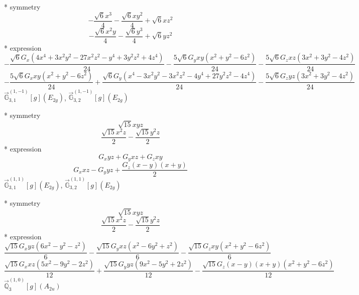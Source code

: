 \documentclass[fleqn,8pt]{jsarticle}
\begin{document}
\noindent\quad ** symmetry
\begin{dmath*}
- \frac{\sqrt{6} x^{3}}{4} - \frac{\sqrt{6} x y^{2}}{4} + \sqrt{6} x z^{2}
\end{dmath*}
\begin{dmath*}
- \frac{\sqrt{6} x^{2} y}{4} - \frac{\sqrt{6} y^{3}}{4} + \sqrt{6} y z^{2}
\end{dmath*}
\noindent\quad ** expression
\begin{dmath*}
- \frac{\sqrt{6} G_{x} \left(4 x^{4} + 3 x^{2} y^{2} - 27 x^{2} z^{2} - y^{4} + 3 y^{2} z^{2} + 4 z^{4}\right)}{24} - \frac{5 \sqrt{6} G_{y} x y \left(x^{2} + y^{2} - 6 z^{2}\right)}{24} - \frac{5 \sqrt{6} G_{z} x z \left(3 x^{2} + 3 y^{2} - 4 z^{2}\right)}{24}
\end{dmath*}
\begin{dmath*}
- \frac{5 \sqrt{6} G_{x} x y \left(x^{2} + y^{2} - 6 z^{2}\right)}{24} + \frac{\sqrt{6} G_{y} \left(x^{4} - 3 x^{2} y^{2} - 3 x^{2} z^{2} - 4 y^{4} + 27 y^{2} z^{2} - 4 z^{4}\right)}{24} - \frac{5 \sqrt{6} G_{z} y z \left(3 x^{2} + 3 y^{2} - 4 z^{2}\right)}{24}
\end{dmath*}
\noindent\quad $\vec{\mathbb{G}}_{3,1}^{(1,-1)}[g](E_{2g})$, $\vec{\mathbb{G}}_{3,2}^{(1,-1)}[g](E_{2g})$

\noindent\quad ** symmetry
\begin{dmath*}
\sqrt{15} x y z
\end{dmath*}
\begin{dmath*}
\frac{\sqrt{15} x^{2} z}{2} - \frac{\sqrt{15} y^{2} z}{2}
\end{dmath*}
\noindent\quad ** expression
\begin{dmath*}
G_{x} y z + G_{y} x z + G_{z} x y
\end{dmath*}
\begin{dmath*}
G_{x} x z - G_{y} y z + \frac{G_{z} \left(x - y\right) \left(x + y\right)}{2}
\end{dmath*}
\noindent\quad $\vec{\mathbb{G}}_{3,1}^{(1,1)}[g](E_{2g})$, $\vec{\mathbb{G}}_{3,2}^{(1,1)}[g](E_{2g})$

\noindent\quad ** symmetry
\begin{dmath*}
\sqrt{15} x y z
\end{dmath*}
\begin{dmath*}
\frac{\sqrt{15} x^{2} z}{2} - \frac{\sqrt{15} y^{2} z}{2}
\end{dmath*}
\noindent\quad ** expression
\begin{dmath*}
\frac{\sqrt{15} G_{x} y z \left(6 x^{2} - y^{2} - z^{2}\right)}{6} - \frac{\sqrt{15} G_{y} x z \left(x^{2} - 6 y^{2} + z^{2}\right)}{6} - \frac{\sqrt{15} G_{z} x y \left(x^{2} + y^{2} - 6 z^{2}\right)}{6}
\end{dmath*}
\begin{dmath*}
\frac{\sqrt{15} G_{x} x z \left(5 x^{2} - 9 y^{2} - 2 z^{2}\right)}{12} + \frac{\sqrt{15} G_{y} y z \left(9 x^{2} - 5 y^{2} + 2 z^{2}\right)}{12} - \frac{\sqrt{15} G_{z} \left(x - y\right) \left(x + y\right) \left(x^{2} + y^{2} - 6 z^{2}\right)}{12}
\end{dmath*}
\noindent\quad $\vec{\mathbb{Q}}_{3}^{(1,0)}[g](A_{2u})$
\end{document}
